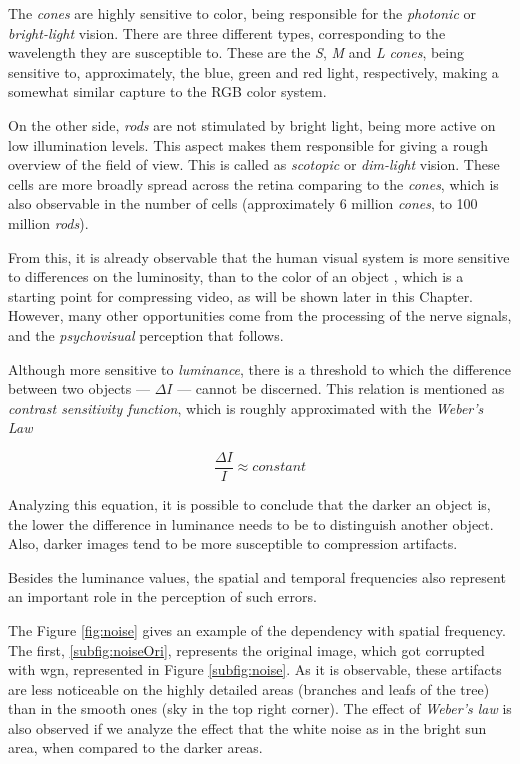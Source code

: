 The \emph{cones} are highly sensitive to color, being responsible for the \emph{photonic} or \emph{bright-light} vision. There are three different types, corresponding to the wavelength they are susceptible to. These are the \emph{S}, \emph{M} and \emph{L} \emph{cones}, being sensitive to, approximately, the blue, green and red light, respectively, making a somewhat similar capture to the RGB color system.

On the other side, \emph{rods} are not stimulated by bright light, being more active on low illumination levels. This aspect makes them responsible for giving a rough overview of the field of view. This is called as \emph{scotopic} or \emph{dim-light} vision. These cells are more broadly spread across the retina comparing to the \emph{cones}, which is also observable in the number of cells (approximately 6 million \emph{cones}, to 100 million \emph{rods}).

From this, it is already observable that the human visual system is more sensitive to differences on the luminosity, than to the color of an object \cite{mullenContrastSensitivityHuman1985}, which is a starting point for compressing video, as will be shown later in this Chapter. However, many other opportunities come from the processing of the nerve signals, and the \emph{psychovisual} perception that follows.

Although more sensitive to \emph{luminance}, there is a threshold to which the difference between two objects --- $\Delta I$ --- cannot be discerned. This relation is mentioned as \emph{contrast sensitivity function}, which is roughly approximated with the \emph{Weber's Law}

\begin{equation}
    \frac{\Delta I}{I}\approx constant
\end{equation}

Analyzing this equation, it is possible to conclude that the darker an object is, the lower the difference in luminance needs to be to distinguish another object. Also, darker images tend to be more susceptible to compression artifacts.

Besides the luminance values, the spatial and temporal frequencies also represent an important role in the perception of such errors. 

The Figure \ref{fig:noise} gives an example of the dependency with spatial frequency. The first, \ref{subfig:noiseOri}, represents the original image, which got corrupted with \gls{wgn}, represented in Figure \ref{subfig:noise}. As it is observable, these artifacts are less noticeable on the highly detailed areas (branches and leafs of the tree) than in the smooth ones (sky in the top right corner). The effect of \emph{Weber's law} is also observed if we analyze the effect that the white noise as in the bright sun area, when compared to the darker areas.

